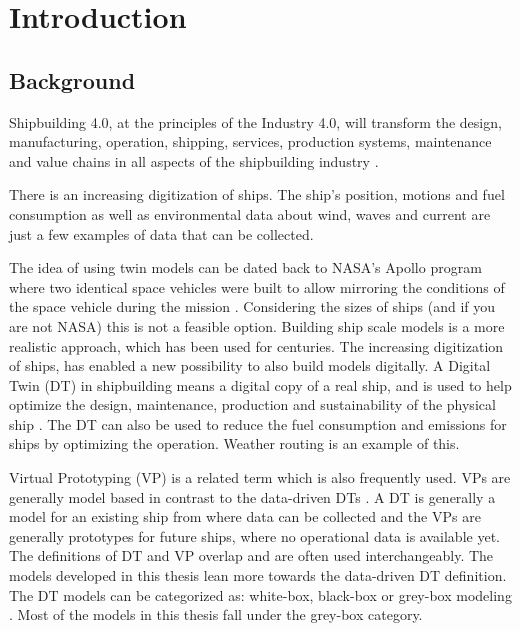 \chapter{Introduction}
\section{Background}
Shipbuilding 4.0, at the principles of the Industry 4.0, will transform the design, manufacturing, operation, shipping, services, production systems, maintenance and value chains in all aspects of the shipbuilding industry \cite{stanic_toward_2018}.

There is an increasing digitization \cite{ichimura_shipping_2022} of ships. The ship's position, motions and fuel consumption as well as environmental data about wind, waves and current are just a few examples of data that can be collected.   


The idea of using twin models can be dated back to NASA’s Apollo program where two identical space vehicles were built to allow mirroring the conditions of the space vehicle during the mission \cite{rosen_about_2015}. Considering the sizes of ships (and if you are not NASA) this is not a feasible option. Building ship scale models is a more realistic approach, which has been used for centuries. The increasing digitization of ships, has enabled a new possibility to also build models digitally. A Digital Twin (DT) in shipbuilding means a digital copy of a real ship, and is used to help optimize the design, maintenance, production and sustainability of the physical ship \cite{chen_review_2021}. The DT can also be used to reduce the fuel consumption and emissions for ships by optimizing the operation. Weather routing is an example of this. 

Virtual Prototyping (VP) is a related term which is also frequently used. VPs are generally model based in contrast to the data-driven DTs \cite{major_framework_2021}. A DT is generally a model for an existing ship from where data can be collected and the VPs are generally prototypes for future ships, where no operational data is available yet. The definitions of DT and VP overlap and are often used interchangeably. The models developed in this thesis lean more towards the data-driven DT definition. The DT models can be categorized as: white-box, black-box or grey-box modeling \cite{leifsson_grey-box_2008}. Most of the models in this thesis fall under the grey-box category.

